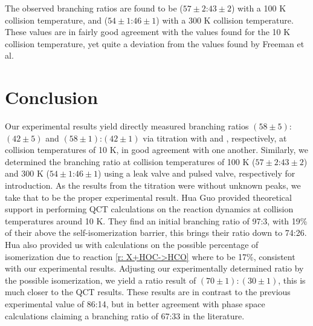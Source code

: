 The observed branching ratios are found to be ($57\pm2$:$43\pm2$) with a 100 K collision temperature, and ($54\pm1$:$46\pm1$) with a 300 K collision temperature. These values are in fairly good agreement with the values found for the 10 K collision temperature, yet quite a deviation from the values found by Freeman et al.\cite{Freeman1987}

\section{Conclusion}

Our experimental results yield directly measured branching ratios $(58\pm5)$:$(42\pm5)$ and $(58\pm1)$:$(42\pm1)$ via titration with  and , respectively, at collision temperatures of 10 K, in good agreement with one another. Similarly, we determined the branching ratio at collision temperatures of 100 K ($57\pm2$:$43\pm2$) and 300 K ($54\pm1$:$46\pm1$) using a leak valve and pulsed valve, respectively for  introduction. As the results from the  titration were without unknown peaks, we take that to be the proper experimental result. Hua Guo provided theoretical support in performing QCT calculations on the  reaction dynamics at collision temperatures around 10 K. They find an initial branching ratio of 97:3, with 19\% of their  above the self-isomerization barrier, this brings their ratio down to 74:26. Hua also provided us with calculations on the possible percentage of isomerization due to reaction \ref{r: X+HOC->HCO} where  to be 17\%, consistent with our experimental results. Adjusting our experimentally determined ratio by the possible isomerization, we yield a ratio result of $(70\pm1):(30\pm1)$, this is much closer to the QCT results. These results are in contrast to the previous experimental value of 86:14\cite{Love1987}, but in better agreement with phase space calculations claiming a branching ratio of 67:33 in the literature.\cite{DeFrees1984}





%

